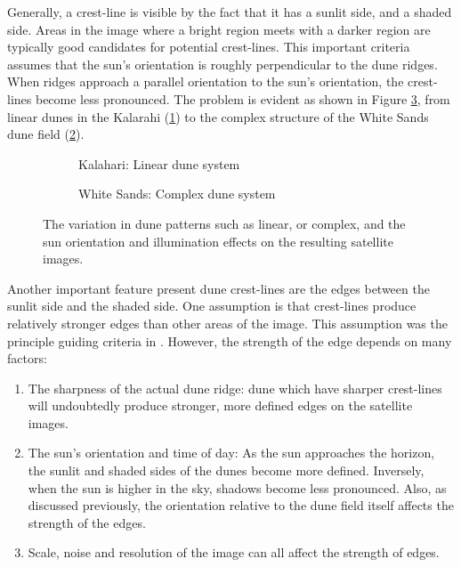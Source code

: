  Generally, a crest-line is visible by the fact that it has a sunlit side, and a shaded side. Areas in the image where a bright region meets with a darker region are typically good candidates for potential crest-lines. This important criteria assumes that the sun's orientation is roughly perpendicular to the dune ridges. When ridges approach a parallel orientation to the sun's orientation, the crest-lines become less pronounced. The problem is evident as shown in Figure \ref{fig:difference_between_dune_field_types}, from linear dunes in the Kalarahi (\ref{fig:difference_between_dune_field_types_kalahari}) to the complex structure of the White Sands dune field (\ref{fig:difference_between_dune_field_types_whitesands}).
 
 \begin{figure}
 	\centering
 	\begin{subfigure}{0.48\textwidth}
 		\centering
 		\caption{Kalahari: Linear dune system}
 		\label{fig:difference_between_dune_field_types_kalahari}
 	\end{subfigure}
 	\begin{subfigure}{0.48\textwidth}
 		\centering
 		\caption{White Sands: Complex dune system}
 		\label{fig:difference_between_dune_field_types_whitesands}
 	\end{subfigure}
 	
 	\caption{The variation in dune patterns such as  linear, or  complex, and the sun orientation and illumination effects on the resulting satellite images.}
 	\label{fig:difference_between_dune_field_types}
 \end{figure}
 
 Another important feature present dune crest-lines are the edges between the sunlit side and the shaded side. One assumption is that crest-lines produce relatively stronger edges than other areas of the image. This assumption was the principle guiding criteria in \cite{2015_automated_mapping_of_linear_dunefield}. However, the strength of the edge depends on many factors:
 
  \begin{enumerate}
	\item The sharpness of the actual dune ridge: dune which have sharper crest-lines will undoubtedly produce stronger, more defined edges on the satellite images.
	\item The sun's orientation and time of day: As the sun approaches the horizon, the sunlit and shaded sides of the dunes become more defined. Inversely, when the sun is higher in the sky, shadows become less pronounced. Also, as discussed previously, the orientation relative to the dune field itself affects the strength of the edges.
	\item Scale, noise and resolution of the image can all affect the strength of edges.
  \end{enumerate}

